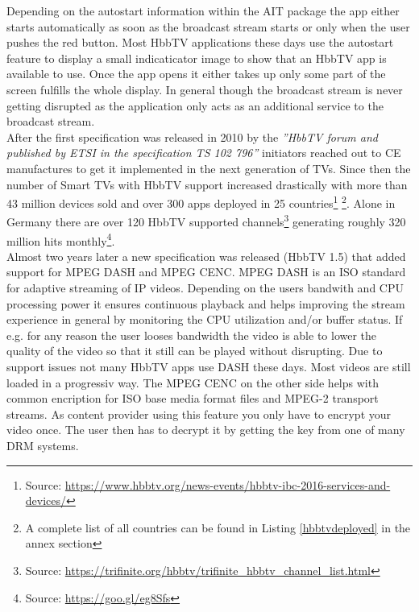 Depending on the autostart information within the AIT package the app either starts automatically
as soon as the broadcast stream starts or only when the user pushes the red button. Most HbbTV
applications these days use the autostart feature to display a small indicaticator image to
show that an HbbTV app is available to use. Once the app opens it either takes up only some part
of the screen fulfills the whole display. In general though the broadcast stream is never
getting disrupted as the application only acts as an additional service to the broadcast stream.\\
After the first specification was released in 2010 by the \textit{''HbbTV forum and published by ETSI
in the specification TS 102 796''} \cite{evolution} initiators reached out to CE manufactures to get
it implemented in the next generation of TVs. Since then the number of Smart TVs with HbbTV support
increased drastically with more than 43 million devices sold and over 300 apps deployed in 25
countries\footnote{Source: \url{https://www.hbbtv.org/news-events/hbbtv-ibc-2016-services-and-devices/}}
\footnote{A complete list of all countries can be found in Listing \ref{hbbtvdeployed} in the annex section}.
Alone in Germany there are over 120 HbbTV supported channels\footnote{Source: \url{https://trifinite.org/hbbtv/trifinite_hbbtv_channel_list.html}}
generating roughly 320 million hits monthly\footnote{Source: \url{https://goo.gl/eg8Sfs}}.\\
Almost two years later a new specification was released (HbbTV 1.5) that added support for MPEG DASH
and MPEG CENC. MPEG DASH is an ISO standard for adaptive streaming of IP videos. Depending on the
users bandwith and CPU processing power it ensures continuous playback and helps improving the stream
experience in general by monitoring the CPU utilization and/or buffer status. If e.g. for any reason
the user looses bandwidth the video is able to lower the quality of the video so that it still can
be played without disrupting. Due to support issues not many HbbTV apps use DASH these days.
Most videos are still loaded in a progressiv way. The MPEG CENC on the other side helps with common
encription for ISO base media format files and MPEG-2 transport streams. As content provider using this
feature you only have to encrypt your video once. The user then has to decrypt it by getting the
key from one of many DRM systems.

